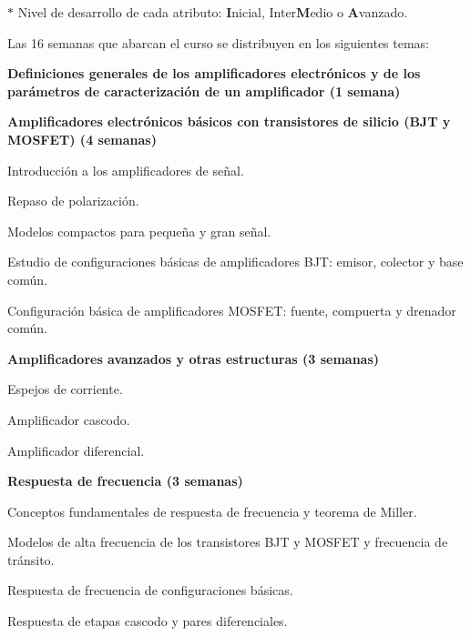 \documentclass[11pt,oneside,letterpaper]{article}
\begin{document}
$\ast$ Nivel de desarrollo de cada atributo: {\bf{I}}nicial, Inter{\bf{M}}edio o {\bf{A}}vanzado.


\newpage
{}
%
Las 16 semanas que abarcan el curso se distribuyen en los siguientes
temas:
\begin{compactenum}[nolistsep]

\item \textbf{Definiciones generales de los amplificadores electrónicos y de los parámetros de caracterización de un amplificador (1 semana)}

\item \textbf{Amplificadores electrónicos básicos con transistores de silicio (BJT y MOSFET) (4 semanas)}
    \begin{compactenum}[nolistsep]
    \item Introducción a los amplificadores de señal.
    \item Repaso de polarización.
    \item Modelos compactos para pequeña y gran señal.
    \item Estudio de configuraciones básicas de amplificadores BJT: emisor, colector y base común.
    \item Configuración básica de amplificadores MOSFET: fuente, compuerta y drenador común.
    \end{compactenum}

\item \textbf{Amplificadores avanzados y otras estructuras (3 semanas)}
    \begin{compactenum}[nolistsep]
    \item Espejos de corriente.
    \item Amplificador cascodo.
    \item Amplificador diferencial.
    \end{compactenum}

\item \textbf{Respuesta de frecuencia (3 semanas)}
    \begin{compactenum}[nolistsep]
    \item Conceptos fundamentales de respuesta de frecuencia y teorema de Miller.
    \item Modelos de alta frecuencia de los transistores BJT y MOSFET y frecuencia de tránsito.
    \item Respuesta de frecuencia de configuraciones básicas.
    \item Respuesta de etapas cascodo y pares diferenciales.
    \end{compactenum}


\end{compactenum}
\end{document}
